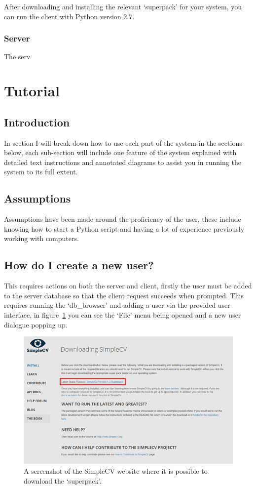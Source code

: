 \documentclass[a4paper]{article}
\begin{document}
        After downloading and installing the relevant `superpack' for your system, you can run the client with Python version 2.7.

    \subsubsection{Server}
        The serv

\section{Tutorial}

    \subsection{Introduction}
        In section I will break down how to use each part of the system in the sections below, each sub-section will include one feature of
        the system explained with detailed text instructions and annotated diagrams to assist you in running the system to its full extent.
    \subsection{Assumptions}
        Assumptions have been made around the proficiency of the user, these include knowing how to start a Python script and having a lot of
        experience previously working with computers.

    \subsection{How do I create a new user?}
        This requires actions on both the server and client, firstly the user must be added to the server database so that the client request 
        succeeds when prompted. This requires running the `db\_browser' and adding a user via the provided user interface, in figure~\ref{fig:dbadduser}
        you can see the `File' menu being opened and a new user dialogue popping up.

        \begin{figure}[H]
            \centering
            \caption{A screenshot of the SimpleCV website where it is possible to download the `superpack'.}
            \label{fig:dbadduser}
                \includegraphics[scale=0.7]{../shared_assets/screenshots/manual/simplecv_download.png}
        \end{figure}
\end{document}
